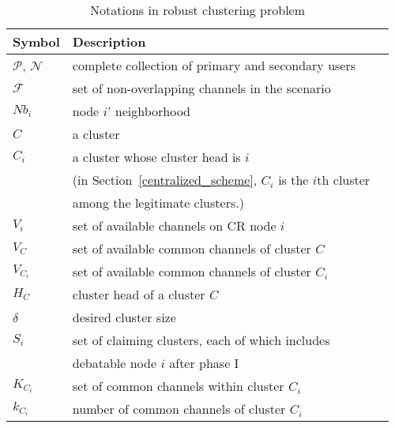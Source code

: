 \documentclass[journal,comsoc]{IEEEtran}
\theoremstyle{mytheoremstyle}
\theoremstyle{mytheoremstyle}
\theoremstyle{mytheoremstyle}
\begin{document}
\begin{table}[h!]
\caption{Notations in robust clustering problem}
\label{tab1}
\centering
\begin{tabular}{llr}
\toprule
Symbol & Description \\
\midrule
$\mathcal{P}$, $\mathcal{N}$  & complete collection of primary and secondary users\\
$\mathcal{F}$ & set of non-overlapping channels in the scenario\\
$Nb_i$ & node $i$' neighborhood     \\
$C$ & a cluster \\
$C_i$ & a cluster whose cluster head is $i$ \\
& (in Section~\ref{centralized_scheme}, $C_i$ is the $i$th cluster \\
& among the legitimate clusters.)\\
$V_i$   & set of available channels on CR node $i$  \\
$V_C$   & set of available common channels of cluster $C$  \\
$V_{C_i}$   & set of available common channels of cluster $C_i$\\
$H_C$ & cluster head of a cluster $C$\\
$\delta$ & desired cluster size\\
$S_i$ & set of claiming clusters, each of which includes \\
& debatable node $i$ after phase I\\
$K_{C_i}$ & set of common channels within cluster $C_i$\\
$k_{C_i}$ & number of common channels of cluster $C_i$\\
\bottomrule
\end{tabular}
\end{table}
\end{document}
